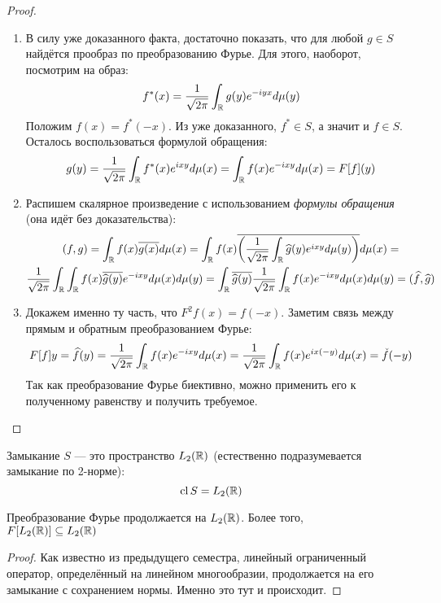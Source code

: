\begin{proof}~
	\begin{enumerate}
		\item В силу уже доказанного факта, достаточно показать, что для любой $g \in S$ найдётся прообраз по преобразованию Фурье. Для этого, наоборот, посмотрим на образ:
		\[
			f^*(x) = \frac{1}{\sqrt{2\pi}}\int_{\mathbb{R}} g(y)e^{-iyx}d\mu(y)
		\]
		Положим $f(x) = f^*(-x)$. Из уже доказанного, $f^* \in S$, а значит и $f \in S$. Осталось воспользоваться формулой обращения:
		\[
			g(y) = \frac{1}{\sqrt{2\pi}}\int_{\mathbb{R}} f^*(x)e^{ixy}d\mu(x) = \int_{\mathbb{R}} f(x)e^{-ixy}d\mu(x) = F[f](y)
		\]
		
		\item Распишем скалярное произведение с использованием \textit{формулы обращения} (она идёт без доказательства):
		\begin{multline*}
			(f, g) = \int_{\mathbb{R}} f(x)\overline{g(x)}d\mu(x) = \int_{\mathbb{R}} f(x)\overline{\left(\frac{1}{\sqrt{2\pi}}\int_{\mathbb{R}} \widehat{g}(y)e^{ixy}d\mu(y)\right)}d\mu(x) =
			\\
			\frac{1}{\sqrt{2\pi}}\int_{\mathbb{R}} \int_{\mathbb{R}} f(x)\overline{\widehat{g}(y)}e^{-ixy}d\mu(x)d\mu(y) = \int_{\mathbb{R}} \overline{\widehat{g}(y)} \frac{1}{\sqrt{2\pi}}\int_{\mathbb{R}} f(x)e^{-ixy}d\mu(x)d\mu(y) = (\widehat{f}, \widehat{g})
		\end{multline*}
		
		\item Докажем именно ту часть, что $F^2f(x) = f(-x)$. Заметим связь между прямым и обратным преобразованием Фурье:
		\[
			F[f]y = \widehat{f}(y) = \frac{1}{\sqrt{2\pi}}\int_{\mathbb{R}} f(x)e^{-ixy}d\mu(x) = \frac{1}{\sqrt{2\pi}}\int_{\mathbb{R}} f(x)e^{ix(-y)}d\mu(x) = \check{f}(-y)
		\]
		Так как преобразование Фурье биективно, можно применить его к полученному равенству и получить требуемое.
	\end{enumerate}
\end{proof}

\begin{reminder}
	Замыкание $S$ --- это пространство $L_2(\mathbb{R})$ (естественно подразумевается замыкание по 2-норме):
	\[
	\operatorname{cl} S = L_2(\mathbb{R})
	\]
\end{reminder}

\begin{proposition}
	Преобразование Фурье продолжается на $L_2(\mathbb{R})$. Более того, \\ $F[L_2(\mathbb{R})] \subseteq L_2(\mathbb{R})$
\end{proposition}

\begin{proof}
	Как известно из предыдущего семестра, линейный ограниченный оператор, определённый на линейном многообразии, продолжается на его замыкание с сохранением нормы. Именно это тут и происходит.
\end{proof}

